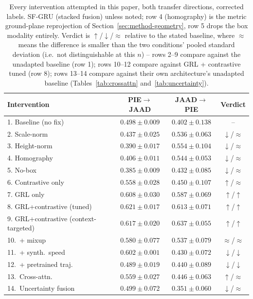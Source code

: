\begin{table}[t]
\centering
\caption{Every intervention attempted in this paper, both transfer
directions, corrected labels. SF-GRU (stacked fusion) unless noted; row
4 (homography) is the metric ground-plane reprojection of
Section~\ref{sec:method-geometry}, row 5 drops the box modality
entirely. Verdict is $\uparrow$/$\downarrow$/$\approx$ relative to the
stated baseline, where $\approx$ means the difference is smaller than
the two conditions' pooled standard deviation (i.e.\ not
distinguishable at this $n$) -- rows 2--9 compare against the unadapted
baseline (row 1); rows 10--12 compare against GRL + contrastive tuned
(row 8); rows 13--14 compare against their own architecture's unadapted
baseline (Tables~\ref{tab:crossattn} and~\ref{tab:uncertainty}).}
\label{tab:summary}
\small
\begin{tabular}{lccc}
\toprule
Intervention & PIE$\to$JAAD & JAAD$\to$PIE & Verdict \\
\midrule
1. Baseline (no fix) & $0.498\pm0.009$ & $0.402\pm0.138$ & -- \\
2. Scale-norm & $0.437\pm0.025$ & $0.536\pm0.063$ & $\downarrow$/$\approx$ \\
3. Height-norm & $0.390\pm0.017$ & $0.554\pm0.104$ & $\downarrow$/$\approx$ \\
4. Homography & $0.406\pm0.011$ & $0.544\pm0.053$ & $\downarrow$/$\approx$ \\
5. No-box & $0.385\pm0.009$ & $0.432\pm0.085$ & $\downarrow$/$\approx$ \\
6. Contrastive only & $0.558\pm0.028$ & $0.450\pm0.107$ & $\uparrow$/$\approx$ \\
7. GRL only & $0.608\pm0.030$ & $0.587\pm0.069$ & $\uparrow$/$\uparrow$ \\
8. GRL+contrastive (tuned) & $\mathbf{0.621\pm0.017}$ & $\mathbf{0.613\pm0.071}$ & $\uparrow$/$\uparrow$ \\
9. GRL+contrastive (context-targeted) & $0.617\pm0.020$ & $0.637\pm0.055$ & $\uparrow$/$\uparrow$ \\
10.\ + mixup & $0.580\pm0.077$ & $0.537\pm0.079$ & $\approx$/$\approx$ \\
11.\ + synth.\ speed & $0.602\pm0.001$ & $0.430\pm0.072$ & $\downarrow$/$\downarrow$ \\
12.\ + pretrained traj.\ & $0.489\pm0.019$ & $0.440\pm0.089$ & $\downarrow$/$\downarrow$ \\
13.\ Cross-attn.\ & $0.559\pm0.027$ & $0.446\pm0.063$ & $\uparrow$/$\approx$ \\
14.\ Uncertainty fusion & $0.499\pm0.072$ & $0.351\pm0.060$ & $\downarrow$/$\approx$ \\
\bottomrule
\end{tabular}
\end{table}


